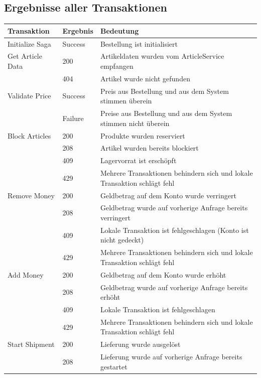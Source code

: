 \subsection{Ergebnisse aller Transaktionen}
\begin{center}
	\begin{longtable}[h]{|p{3cm}|p{1.5cm}|p{11cm}|}
		\hline
		Transaktion	& Ergebnis & Bedeutung \\ \hline
		Initialize Saga 	& Success 	& Bestellung ist initialisiert \\ \hline
		Get Article Data	& 200 		& Artikeldaten wurden vom ArticleService empfangen \\
							& 404 		& Artikel wurde nicht gefunden \\ \hline
		Validate Price 		& Success 	& Preis aus Bestellung und aus dem System stimmen überein \\
							& Failure 	& Preise aus Bestellung und aus dem System stimmen nicht überein \\ \hline
		Block Articles		& 200		& Produkte wurden reserviert \\
							& 208		& Artikel wurden bereits blockiert \\
							& 409 		& Lagervorrat ist erschöpft \\
							& 429 		& Mehrere Transaktionen behindern sich und lokale Transaktion schlägt fehl \\ \hline
		Remove Money 		& 200		& Geldbetrag auf dem Konto wurde verringert \\
							& 208		& Geldbetrag wurde auf vorherige Anfrage bereits verringert \\
							& 409		& Lokale Transaktion ist fehlgeschlagen (Konto ist nicht gedeckt) \\
							& 429		& Mehrere Transaktionen behindern sich und lokale Transaktion schlägt fehl \\ \hline
		Add Money 			& 200		& Geldbetrag auf dem Konto wurde erhöht \\
							& 208		& Geldbetrag wurde auf vorherige Anfrage bereits erhöht \\
							& 409		& Lokale Transaktion ist fehlgeschlagen \\
							& 429		& Mehrere Transaktionen behindern sich und lokale Transaktion schlägt fehl \\ \hline
		Start Shipment 		& 200		& Lieferung wurde ausgelöst \\
							& 208		& Lieferung wurde auf vorherige Anfrage bereits gestartet \\

\end{longtable}
\end{center}
